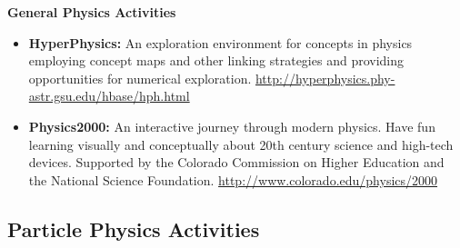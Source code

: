\textbf{General Physics Activities}

\begin{itemize}
\item
  \textbf{HyperPhysics:} An exploration environment for concepts in
  physics employing concept maps and other linking strategies and
  providing opportunities for numerical exploration.
  \url{http://hyperphysics.phy-astr.gsu.edu/hbase/hph.html}
\item
  \textbf{Physics2000:} An interactive journey through modern physics.
  Have fun learning visually and conceptually about 20th century science
  and high-tech devices. Supported by the Colorado Commission on Higher
  Education and the National Science Foundation.
  \url{http://www.colorado.edu/physics/2000}
\end{itemize}

\subsection{Particle Physics
Activities}\label{particle-physics-activities}

